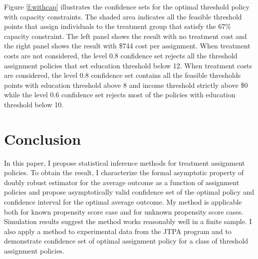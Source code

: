 \documentclass[12pt,oneside,reqno,english]{amsart}
\theoremstyle{definition}
\begin{document}
Figure \ref{f:withcap} illustrates the confidence sets for the optimal threshold policy with capacity constraints. 
The shaded area indicates all the feasible threshold points that assign individuals to the treatment group that satisfy the 67\% capacity constraint. The left panel shows the result with no treatment cost and the right panel shows the result with \$744 cost per assignment. When treatment costs are not considered, the level 0.8 confidence set rejects all the threshold assignment policies that set education threshold below 12. When treatment costs are considered, the level $0.8$ confidence set contains all the feasible thresholds points with education threshold above 8 and income threshold strictly above \$0 while the level $0.6$ confidence set rejects most of the policies with education threshold below 10. 


\section{Conclusion}
In this paper, I propose statistical inference methods for treatment assignment policies.  
To obtain the result, I characterize the formal asymptotic property of doubly robust estimator for the average outcome as a function of assignment policies and propose 
asymptotically valid confidence set of the optimal policy and confidence interval for the optimal average outcome. My method is applicable both for
 known propensity score case and for unknown propensity score cases. Simulation results suggest the method works reasonably well in a finite sample. 
I also apply a method to experimental data from the JTPA program and to demonstrate confidence set of optimal assignment policy for a class of threshold assignment policies. 
\newpage
\appendix
\end{document}
